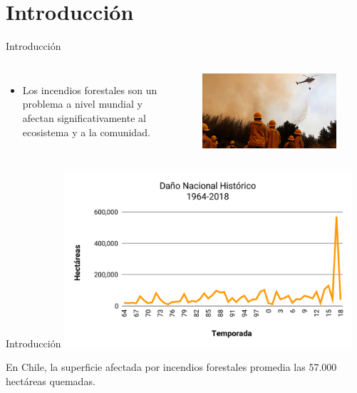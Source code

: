 \section{Introducción }

\begin{frame}{Introducción}
	\begin{columns}
        \begin{itemize}
        \item Los incendios forestales son un problema a nivel mundial y afectan significativamente al ecosistema y a la comunidad. 

        \end{itemize}
        
	\begin{figure}[H]
	\centering
 \includegraphics[width=1\textwidth]{fig/conaf.jpg}
	\end{figure}
	\end{columns}
\end{frame}




\begin{frame}{Introducción}
\centering
 \includegraphics[width=0.8\textwidth]{fig/chart.pdf}
 \newline
 \begin{text}
En Chile, la superficie afectada por incendios forestales promedia las 57.000 hectáreas quemadas. 
\end{text}
\end{frame}











